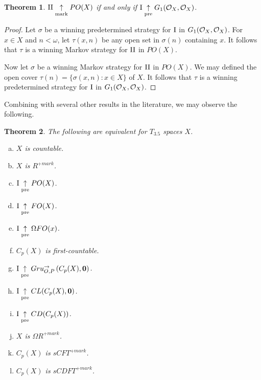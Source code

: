 \documentclass[11pt]{article}
\theoremstyle{plain}
\newtheorem{theorem}{Theorem}
\theoremstyle{definition}
\theoremstyle{remark}
\theoremstyle{plain}
\theoremstyle{definition}
\theoremstyle{remark}
\begin{document}
\begin{theorem}
\(\mathrm{II}\underset{\text{mark}}{\uparrow} PO(X)\) if and only if \(\mathrm{I}\underset{\text{pre}}{\uparrow}G_1(\mathcal{O}_{X},\mathcal{O}_{X})\).
\end{theorem}
\begin{proof}
Let \(\sigma\) be a winning predetermined strategy for \(\mathrm{I}\) in \(G_1(\mathcal{O}_{X},\mathcal{O}_{X})\).
For \(x\in X\) and \(n<\omega\), let \(\tau(x,n)\) be any open set in \(\sigma(n)\)
containing \(x\). It follows that \(\tau\) is a winning Markov strategy for
\(\mathrm{II}\) in \(PO(X)\).

Now let \(\sigma\) be a winning Markov strategy for \(\mathrm{II}\) in \(PO(X)\).
We may defined the open cover \(\tau(n)=\{\sigma(x,n):x\in X\}\) of \(X\).
It follows that \(\tau\) is a winning predetermined strategy for \(\mathrm{I}\)
in \(G_1(\mathcal{O}_{X},\mathcal{O}_{X})\).
\end{proof}


Combining with several other results in the literature,
we may observe the following.

\begin{theorem}
The following are equivalent for \(T_{3.5}\) spaces \(X\).
\begin{enumerate}[a)]
\item \(X\) is countable.
\item \(X\) is \(R^{+mark}\).
\item \(\mathrm{I}\underset{\text{pre}}{\uparrow} PO(X)\). 
\item \(\mathrm{I}\underset{\text{pre}}{\uparrow} FO(X)\).
\item \(\mathrm{I}\underset{\text{pre}}{\uparrow}\Omega FO(x)\).
\item \(C_p(X)\) is first-countable.
\item \(\mathrm{I}\underset{\text{pre}}{\uparrow} Gru_{O,P}^{\to}\left({C_p(X)},{\mathbf 0}\right)\).
\item \(\mathrm{I}\underset{\text{pre}}{\uparrow} CL(C_p(X),\mathbf 0)\).
\item \(\mathrm{I}\underset{\text{pre}}{\uparrow} CD(C_p(X))\).
\item \(X\) is \(\Omega R^{+mark}\).
\item \(C_p(X)\) is \(sCFT^{+mark}\).
\item \(C_p(X)\) is \(sCDFT^{+mark}\).
\end{enumerate}
\end{theorem}
\end{document}
